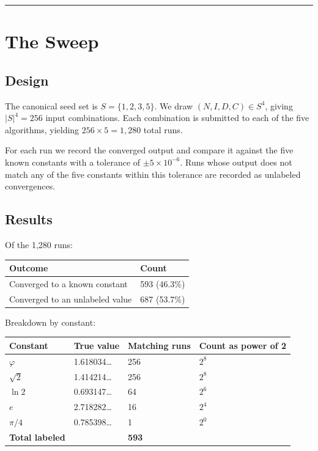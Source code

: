 \documentclass[12pt]{article}
\begin{document}
\begin{center}\rule{0.5\linewidth}{0.5pt}\end{center}

\section{The Sweep}\label{the-sweep}

\subsection{Design}\label{design}

The canonical seed set is \(S = \{1, 2, 3, 5\}\). We draw
\((N, I, D, C) \in S^4\), giving \(|S|^4 = 256\) input combinations.
Each combination is submitted to each of the five algorithms, yielding
\(256 \times 5 = 1{,}280\) total runs.

For each run we record the converged output and compare it against the
five known constants with a tolerance of \(\pm 5 \times 10^{-6}\). Runs
whose output does not match any of the five constants within this
tolerance are recorded as unlabeled convergences.

\subsection{Results}\label{results}

Of the 1,280 runs:

\begin{longtable}[]{@{}ll@{}}
\toprule\noalign{}
Outcome & Count \\
\midrule\noalign{}
\endhead
\bottomrule\noalign{}
\endlastfoot
Converged to a known constant & 593 (46.3\%) \\
Converged to an unlabeled value & 687 (53.7\%) \\
\end{longtable}

Breakdown by constant:

\begin{longtable}[]{@{}llll@{}}
\toprule\noalign{}
Constant & True value & Matching runs & Count as power of 2 \\
\midrule\noalign{}
\endhead
\bottomrule\noalign{}
\endlastfoot
\(\varphi\) & 1.618034\ldots{} & 256 & \(2^8\) \\
\(\sqrt{2}\) & 1.414214\ldots{} & 256 & \(2^8\) \\
\(\ln 2\) & 0.693147\ldots{} & 64 & \(2^6\) \\
\(e\) & 2.718282\ldots{} & 16 & \(2^4\) \\
\(\pi/4\) & 0.785398\ldots{} & 1 & \(2^0\) \\
\textbf{Total labeled} & & \textbf{593} & \\
\end{longtable}
\end{document}
